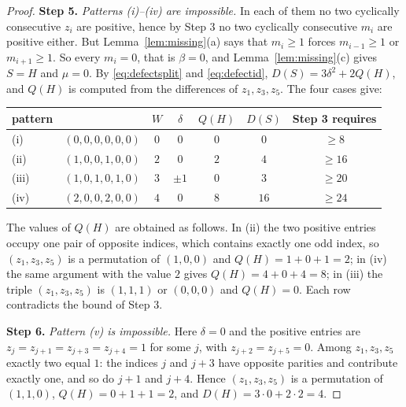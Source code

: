 \documentclass[11pt]{article}
\theoremstyle{plain}
\theoremstyle{definition}
\theoremstyle{remark}
\begin{document}
\begin{proof}
\medskip\noindent\textbf{Step 5.} \emph{Patterns \textup{(i)}--\textup{(iv)} are
impossible.} In each of them no two cyclically consecutive \(z_{i}\) are positive, hence by
Step 3 no two cyclically consecutive \(m_{i}\) are positive either. But
Lemma~\ref{lem:missing}(a) says that \(m_{i}\ge1\) forces \(m_{i-1}\ge1\) or
\(m_{i+1}\ge1\). So every \(m_{i}=0\), that is \(\beta=0\), and
Lemma~\ref{lem:missing}(c) gives \(S=H\) and \(\mu=0\). By \eqref{eq:defectsplit} and
\eqref{eq:defectid}, \(D(S)=3\delta^{2}+2Q(H)\), and \(Q(H)\) is computed from the
differences of \(z_{1},z_{3},z_{5}\). The four cases give:

\begin{center}
\begin{tabular}{llccccc}
\hline
pattern & & \(W\) & \(\delta\) & \(Q(H)\) & \(D(S)\) & Step 3 requires \\
\hline
(i)   & \((0,0,0,0,0,0)\) & \(0\) & \(0\)   & \(0\) & \(0\)  & \(\ge8\) \\
(ii)  & \((1,0,0,1,0,0)\) & \(2\) & \(0\)   & \(2\) & \(4\)  & \(\ge16\) \\
(iii) & \((1,0,1,0,1,0)\) & \(3\) & \(\pm1\)& \(0\) & \(3\)  & \(\ge20\) \\
(iv)  & \((2,0,0,2,0,0)\) & \(4\) & \(0\)   & \(8\) & \(16\) & \(\ge24\) \\
\hline
\end{tabular}
\end{center}

The values of \(Q(H)\) are obtained as follows. In (ii) the two positive entries occupy one
pair of opposite indices, which contains exactly one odd index, so
\((z_{1},z_{3},z_{5})\) is a permutation of \((1,0,0)\) and \(Q(H)=1+0+1=2\); in (iv) the
same argument with the value \(2\) gives \(Q(H)=4+0+4=8\); in (iii) the triple
\((z_{1},z_{3},z_{5})\) is \((1,1,1)\) or \((0,0,0)\) and \(Q(H)=0\). Each row contradicts
the bound of Step 3.

\medskip\noindent\textbf{Step 6.} \emph{Pattern \textup{(v)} is impossible.} Here
\(\delta=0\) and the positive entries are \(z_{j}=z_{j+1}=z_{j+3}=z_{j+4}=1\) for some
\(j\), with \(z_{j+2}=z_{j+5}=0\). Among \(z_{1},z_{3},z_{5}\) exactly two equal \(1\):
the indices \(j\) and \(j+3\) have opposite parities and contribute exactly one, and so do
\(j+1\) and \(j+4\). Hence \((z_{1},z_{3},z_{5})\) is a permutation of \((1,1,0)\),
\(Q(H)=0+1+1=2\), and \(D(H)=3\cdot0+2\cdot2=4\).


\end{proof}
\end{document}
